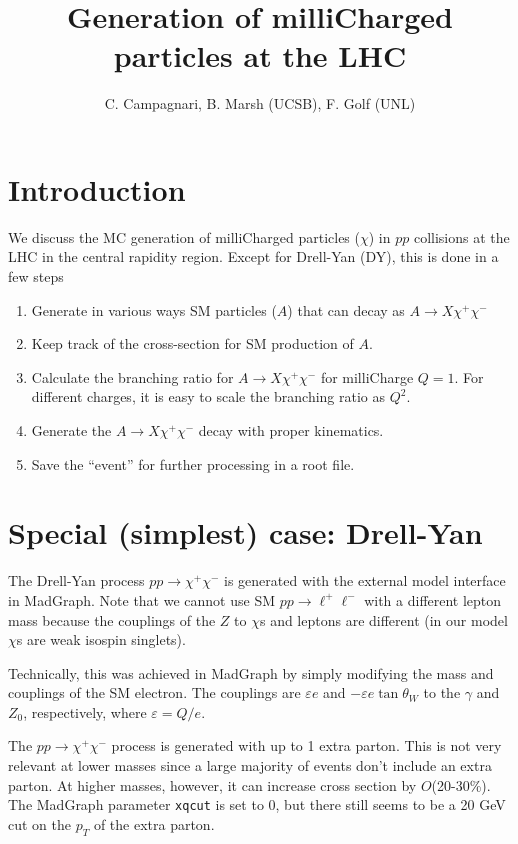 \documentclass[12pt]{article}
\title{Generation of milliCharged particles at the LHC}
\author{C. Campagnari, B. Marsh (UCSB), F. Golf (UNL)}
\begin{document}
\maketitle


\section{Introduction}
We discuss the MC generation of milliCharged
particles ($\chi$) in $pp$ collisions at the LHC in the central rapidity
region. 
Except for Drell-Yan (DY), this is done in a few steps
\begin{enumerate}
\item Generate in various ways SM particles ($A$) that can decay as
  $A \to X \chi^+ \chi^-$
\item Keep track of the cross-section for SM production of $A$.
\item Calculate the branching ratio for $A \to X \chi^+ \chi^-$
  for milliCharge $Q=1$.  For different charges, it is easy to
  scale the branching ratio as $Q^2$.
\item Generate the $A \to X \chi^+ \chi^-$ decay with proper
  kinematics.
\item Save the ``event'' for further processing in a root file.
  \end{enumerate}
  


\section{Special (simplest) case: Drell-Yan}
The Drell-Yan process $pp \to \chi^+ \chi^-$ is generated with
the external model interface in MadGraph.  Note that we cannot use
SM $pp \to \ell^+ \ell^-$ with a different lepton mass
because the couplings of the $Z$ to
$\chi$s and leptons are different
(in our model $\chi$s are weak isospin
singlets\cite{Holdom}\cite{Haas:2014dda}).

Technically, this was achieved in MadGraph by simply modifying the mass and couplings
of the SM electron. The couplings are $\varepsilon e$ and $-\varepsilon e\tan\theta_W$ to
the $\gamma$ and $Z_0$, respectively, where $\varepsilon = Q/e$.

The $pp\to\chi^+\chi^-$ process is generated with up to 1 extra parton. This is not very 
relevant at lower masses since a large majority of events don't include an extra parton. At 
higher masses, however, it can increase cross section by $O$(20-30\%). The MadGraph
parameter \texttt{xqcut} is set to 0, but there still seems to be a 20 GeV cut on the $p_T$
of the extra parton.
\end{document}
